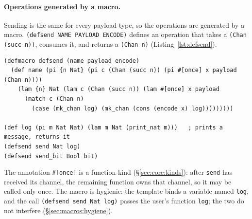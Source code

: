 \paragraph{Operations generated by a macro.}
Sending is the same for every payload type, so the operations are generated by a macro.
\lstinline|(defsend NAME PAYLOAD ENCODE)| defines an operation that takes a \lstinline|(Chan (succ n))|, consumes it, and returns a \lstinline|(Chan n)| (Listing~\ref{lst:defsend}).
\begin{lstlisting}[float=*,caption={The \texttt{defsend} macro and the two calls that generate \texttt{send} and \texttt{send\_bit} (\texttt{case\_studies/lrl/protocol.lrl}).},label={lst:defsend}]
(defmacro defsend (name payload encode)
  (def name (pi {n Nat} (pi c (Chan (succ n)) (pi #[once] x payload (Chan n))))
    (lam {n} Nat (lam c (Chan (succ n)) (lam #[once] x payload
      (match c (Chan n)
        (case (mk_chan log) (mk_chan (cons (encode x) log)))))))))

(def log (pi m Nat Nat) (lam m Nat (print_nat m)))   ; prints a message, returns it
(defsend send Nat log)
(defsend send_bit Bool bit)
\end{lstlisting}
The annotation \lstinline|#[once]| is a function kind (\S\ref{sec:core:kinds}): after \lstinline|send| has received its channel, the remaining function owns that channel, so it may be called only once.
The macro is hygienic: the template binds a variable named \lstinline|log|, and the call \lstinline|(defsend send Nat log)| passes the user's function \lstinline|log|; the two do not interfere (\S\ref{sec:macros:hygiene}).

